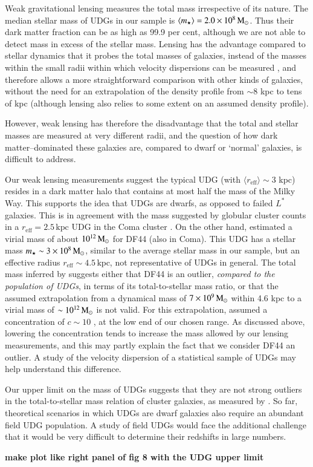 \documentclass[usenatbib,fleqn]{mnras}
\def\percent{ per cent}
\def\reff{r_\mathrm{eff}}
\begin{document}
Weak gravitational lensing measures the total mass irrespective of its nature. The median stellar mass of UDGs in our sample is $\langle m_\star \rangle = 2.0\times10^8\,\mathrm{M}_\odot$. Thus their dark matter fraction can be as high as 99.9\percent, although we are not able to detect mass in excess of the stellar mass. Lensing has the advantage compared to stellar dynamics that it probes the total masses of galaxies, instead of the masses within the small radii within which velocity dispersions can be measured \citep[e.g., roughly 8 kpc in the case of DF17 in the Coma cluster][]{beasley16_acs,peng16}, and therefore allows a more straightforward comparison with other kinds of galaxies, without the need for an extrapolation of the density profile from $\sim8$ kpc to tens of kpc (although lensing also relies to some extent on an assumed density profile).

However, weak lensing has therefore the disadvantage that the total and stellar masses are measured at very different radii, and the question of how dark matter--dominated these galaxies are, compared to dwarf or `normal' galaxies, is difficult to address.

Our weak lensing measurements suggest the typical UDG (with $\langle\reff\rangle\sim3$ kpc) resides in a dark matter halo that contains at most half the mass of the Milky Way. This supports the idea that UDGs are dwarfs, as opposed to failed $L^*$ galaxies. This is in agreement with the mass suggested by globular cluster counts in a $\reff=2.5\,\mathrm{kpc}$ UDG in the Coma cluster \citep{beasley16_acs,peng16}. On the other hand, \cite{vandokkum16} estimated a virial mass of about $10^{12}\,\mathrm{M}_\odot$ for DF44 (also in Coma). This UDG has a stellar mass $m_\star\sim3\times10^8\,\mathrm{M}_\odot$, similar to the average stellar mass in our sample, but an effective radius $\reff\sim4.5\,\mathrm{kpc}$, not representative of UDGs in general. The total mass inferred by \cite{vandokkum16} suggests either that DF44 is an outlier, \emph{compared to the population of UDGs}, in terms of its total-to-stellar mass ratio, or that the assumed extrapolation from a dynamical mass of $7\times10^9\,\mathrm{M}_\odot$ within 4.6 kpc to a virial mass of $\sim10^{12}\,\mathrm{M}_\odot$ is not valid. For this extrapolation, \cite{vandokkum16} assumed a concentration of $c\sim10$ \citep{maccio08}, at the low end of our chosen range. As discussed above, lowering the concentration tends to increase the mass allowed by our lensing measurements, and this may partly explain the fact that we consider DF44 an outlier. A study of the velocity dispersion of a statistical sample of UDGs may help understand this difference.

Our upper limit on the mass of UDGs suggests that they are not strong outliers in the total-to-stellar mass relation of cluster galaxies, as measured by \cite{sifon17}. So far, theoretical scenarios in which UDGs are dwarf galaxies also require an abundant field UDG population. A study of field UDGs would face the additional challenge that it would be very difficult to determine their redshifts in large numbers.

\textbf{make plot like right panel of fig 8 with the UDG upper limit}





\end{document}

